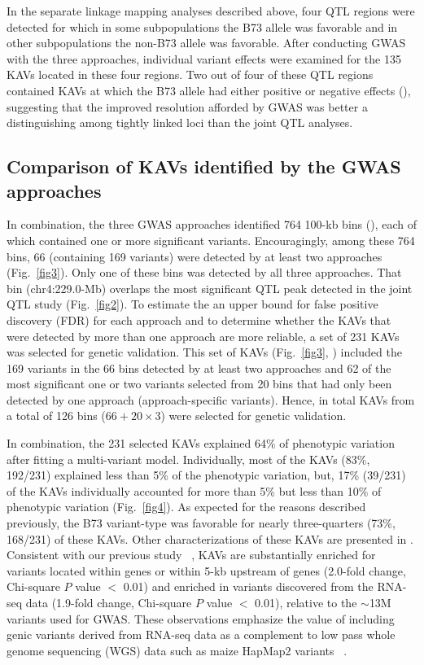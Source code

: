 \documentclass[10pt,letterpaper]{article}
\begin{document}
In the separate linkage mapping analyses described above, four QTL regions were detected for which in some subpopulations the B73 allele was favorable and in other subpopulations the non-B73 allele was favorable. After conducting GWAS with the three approaches, individual variant effects were examined for the 135 KAVs located in these four regions. Two out of four of these QTL regions contained KAVs at which the B73 allele had either positive or negative effects (), suggesting that the improved resolution afforded by GWAS was better a distinguishing among tightly linked loci than the joint QTL analyses. 

\subsection*{Comparison of KAVs identified by the GWAS approaches}
In combination, the three GWAS approaches identified 764 100-kb bins (), each of which contained one or more significant variants. Encouragingly, among these 764 bins, 66 (containing 169 variants) were detected by at least two approaches (Fig.~\ref{fig3}). Only one of these bins was detected by all three approaches. That bin (chr4:229.0-Mb) overlaps the most significant QTL peak detected in the joint QTL study (Fig.~\ref{fig2}). To estimate the an upper bound for false positive discovery (FDR) for each approach and to determine whether the KAVs that were detected by more than one approach are more reliable, a set of 231 KAVs was selected for genetic validation. This set of KAVs (Fig.~\ref{fig3}, ) included the 169 variants in the 66 bins detected by at least two approaches and 62 of the most significant one or two variants selected from 20 bins that had only been detected by one approach (approach-specific variants). Hence, in total KAVs from a total of 126 bins ($66 + 20 \times 3$) were selected for genetic validation.

In combination, the 231 selected KAVs explained 64\% of phenotypic variation after fitting a multi-variant model. Individually, most of the KAVs (83\%, 192/231) explained less than 5\% of the phenotypic variation, but, 17\% (39/231) of the KAVs individually accounted for more than 5\% but less than 10\% of phenotypic variation (Fig.~\ref{fig4}). As expected for the reasons described previously, the B73 variant-type was favorable for nearly three-quarters (73\%, 168/231) of these KAVs. Other characterizations of these KAVs are presented in .  Consistent with our previous study ~\cite{Li2012}, KAVs are substantially enriched for variants located within genes or within 5-kb upstream of genes (2.0-fold change, Chi-square $P$ value $<$ 0.01) and enriched in variants discovered from the RNA-seq data (1.9-fold change, Chi-square $P$ value $<$ 0.01), relative to the $\sim$13M variants used for GWAS. These observations emphasize the value of including genic variants derived from RNA-seq data as a complement to low pass whole genome sequencing (WGS) data such as maize HapMap2 variants ~\cite{Chia2012}.
\end{document}
